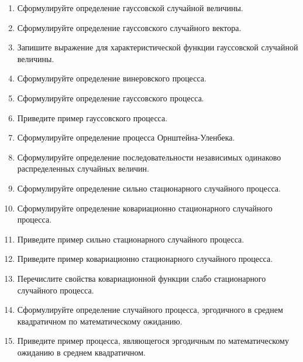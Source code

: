 \documentclass[a4paper,12pt]{extreport}
\renewcommand{\=}[1]{\stackrel{#1}{=}} %
\begin{document}
\begin{enumerate}
	\item Сформулируйте определение гауссовской случайной величины.
	\item Сформулируйте определение гауссовского случайного вектора.
	\item Запишите выражение для характеристической функции гауссовской
	случайной величины.


	\item Сформулируйте определение винеровского процесса.
	\item Сформулируйте определение гауссовского процесса.
	\item Приведите пример гауссовского процесса.
	\item Сформулируйте определение процесса Орнштейна-Уленбека.

	\item Сформулируйте определение последовательности независимых 
	одинаково распределенных случайных величин.
	\item Сформулируйте определение сильно стационарного случайного процесса.
	\item Сформулируйте определение ковариационно стационарного случайного процесса.
	\item Приведите пример сильно стационарного случайного процесса.
	\item Приведите пример ковариационно стационарного случайного процесса.
	\item Перечислите свойства ковариационной функции 
	слабо стационарного случайного процесса.
	\item Сформулируйте определение случайного процесса,
	эргодичного в среднем квадратичном по математическому ожиданию.
	\item Приведите пример процесса, являющегося эргодичным по математическому ожиданию
	в среднем квадратичном.


\end{enumerate}
\end{document}
